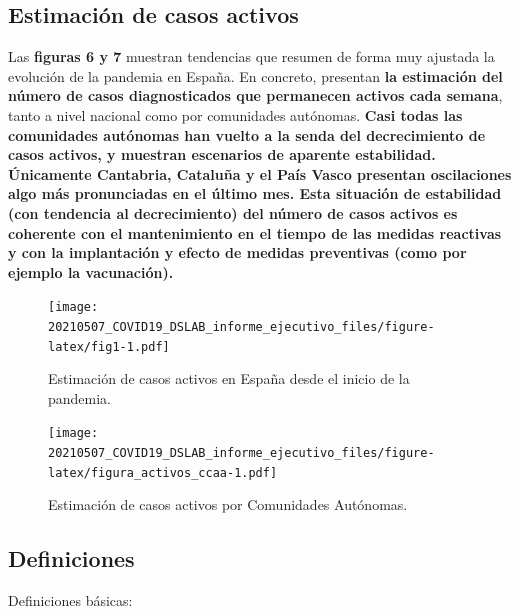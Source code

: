 \documentclass[
  11pt,
]{article}
\begin{document}
\clearpage

\setcounter{page}{9}

\hypertarget{estimaciuxf3n-de-casos-activos}{%
\subsection{Estimación de casos
activos}\label{estimaciuxf3n-de-casos-activos}}

Las \textbf{figuras 6 y 7} muestran tendencias que resumen de forma muy
ajustada la evolución de la pandemia en España. En concreto, presentan
\textbf{la estimación del número de casos diagnosticados que permanecen
activos cada semana}, tanto a nivel nacional como por comunidades
autónomas. \textbf{Casi todas las comunidades autónomas han vuelto a la
senda del decrecimiento de casos activos, y muestran escenarios de
aparente estabilidad. Únicamente Cantabria, Cataluña y el País Vasco
presentan oscilaciones algo más pronunciadas en el último mes. Esta
situación de estabilidad (con tendencia al decrecimiento) del número de
casos activos es coherente con el mantenimiento en el tiempo de las
medidas reactivas y con la implantación y efecto de medidas preventivas
(como por ejemplo la vacunación).}

\vspace{0.2cm}

\begin{figure}
\centering
\texttt{[image: 20210507\_COVID19\_DSLAB\_informe\_ejecutivo\_files/figure-latex/fig1-1.pdf]}
\caption{\label{fig:fig17a_res} Estimación de casos activos en España
desde el inicio de la pandemia.}
\end{figure}

\begin{figure}
\centering
\texttt{[image: 20210507\_COVID19\_DSLAB\_informe\_ejecutivo\_files/figure-latex/figura\_activos\_ccaa-1.pdf]}
\caption{\label{fig:figura_activos_ccaa} Estimación de casos activos por
Comunidades Autónomas.}
\end{figure}

\newpage
\setcounter{page}{11}

\hypertarget{definiciones}{%
\subsection{Definiciones}\label{definiciones}}

Definiciones básicas:
\end{document}
